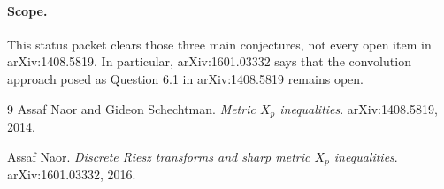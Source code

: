 \documentclass[11pt]{article}
\begin{document}
\paragraph{Scope.}
This status packet clears those three main conjectures, not every open item in arXiv:1408.5819.  In particular, arXiv:1601.03332 says that the convolution approach posed as Question 6.1 in arXiv:1408.5819 remains open.

\begin{thebibliography}{9}
Assaf Naor and Gideon Schechtman.
\newblock \emph{Metric \(X_p\) inequalities}.
\newblock arXiv:1408.5819, 2014.

Assaf Naor.
\newblock \emph{Discrete Riesz transforms and sharp metric \(X_p\) inequalities}.
\newblock arXiv:1601.03332, 2016.
\end{thebibliography}
\end{document}

